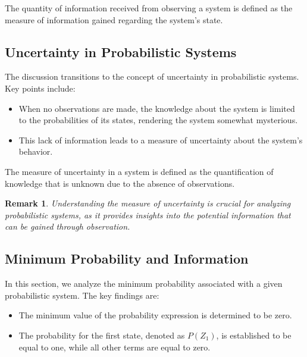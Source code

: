 \documentclass[12pt,a4paper]{article}
\newenvironment{defbox}[1][]{%
  \begin{tcolorbox}[enhanced, breakable, colback=defcolor, colframe=green!50!black, title=#1, fonttitle=\bfseries, arc=3pt, boxrule=0.5pt]
}{\end{tcolorbox}}
\newtheorem{remark}{Remark}[section]
\begin{document}
\begin{defbox}[Quantity of Information]
The quantity of information received from observing a system is defined as the measure of information gained regarding the system's state.
\end{defbox}

\subsection{Uncertainty in Probabilistic Systems}
The discussion transitions to the concept of uncertainty in probabilistic systems. Key points include:

\begin{itemize}
    \item When no observations are made, the knowledge about the system is limited to the probabilities of its states, rendering the system somewhat mysterious.
    \item This lack of information leads to a measure of uncertainty about the system's behavior.
\end{itemize}

\begin{defbox}[Measure of Uncertainty]
The measure of uncertainty in a system is defined as the quantification of knowledge that is unknown due to the absence of observations.
\end{defbox}

\begin{remark}
Understanding the measure of uncertainty is crucial for analyzing probabilistic systems, as it provides insights into the potential information that can be gained through observation.
\end{remark}

\subsection{Minimum Probability and Information}
In this section, we analyze the minimum probability associated with a given probabilistic system. The key findings are:

\begin{itemize}
    \item The minimum value of the probability expression is determined to be zero.
    \item The probability for the first state, denoted as \( P(Z_1) \), is established to be equal to one, while all other terms are equal to zero.
\end{itemize}
\end{document}
